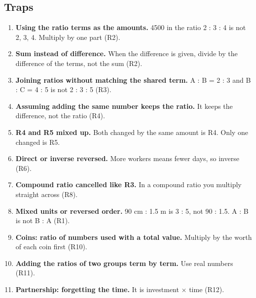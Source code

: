 \documentclass[11pt,a4paper]{article}
\let\oldsubsection\subsection
\renewcommand{\subsection}{\needspace{9\baselineskip}\oldsubsection}
\begin{document}
\subsection*{Traps}
\begin{enumerate}
\item \textbf{Using the ratio terms as the amounts.} 4500 in the ratio 2 : 3 : 4 is not 2, 3, 4. Multiply by one part (R2).
\item \textbf{Sum instead of difference.} When the difference is given, divide by the difference of the terms, not the sum (R2).
\item \textbf{Joining ratios without matching the shared term.} A : B = 2 : 3 and B : C = 4 : 5 is not 2 : 3 : 5 (R3).
\item \textbf{Assuming adding the same number keeps the ratio.} It keeps the difference, not the ratio (R4).
\item \textbf{R4 and R5 mixed up.} Both changed by the same amount is R4. Only one changed is R5.
\item \textbf{Direct or inverse reversed.} More workers means fewer days, so inverse (R6).
\item \textbf{Compound ratio cancelled like R3.} In a compound ratio you multiply straight across (R8).
\item \textbf{Mixed units or reversed order.} 90 cm : 1.5 m is 3 : 5, not 90 : 1.5. A : B is not B : A (R1).
\item \textbf{Coins: ratio of numbers used with a total value.} Multiply by the worth of each coin first (R10).
\item \textbf{Adding the ratios of two groups term by term.} Use real numbers (R11).
\item \textbf{Partnership: forgetting the time.} It is investment $\times$ time (R12).
\end{enumerate}
\end{document}

